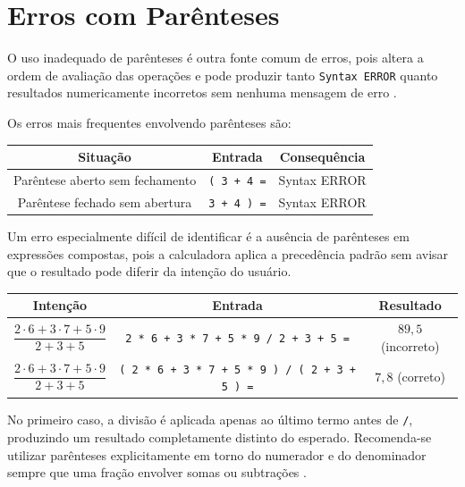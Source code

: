 \section{Erros com Parênteses}

O uso inadequado de parênteses é outra fonte comum de erros, pois altera a ordem de avaliação das operações e pode produzir tanto \texttt{Syntax ERROR} quanto resultados numericamente incorretos sem nenhuma mensagem de erro \cite{casio2004}.

Os erros mais frequentes envolvendo parênteses são:

\begin{table}[H]
    \centering
    \begin{tabular}{|c|c|c|}
        \hline
        \textbf{Situação} & \textbf{Entrada} & \textbf{Consequência} \\ \hline
        Parêntese aberto sem fechamento & \texttt{( 3 + 4 =} & Syntax ERROR \\
        Parêntese fechado sem abertura & \texttt{3 + 4 ) =} & Syntax ERROR \\ \hline
    \end{tabular}
\end{table}

Um erro especialmente difícil de identificar é a ausência de parênteses em expressões compostas, pois a calculadora aplica a precedência padrão sem avisar que o resultado pode diferir da intenção do usuário.

\begin{table}[H]
    \centering
    \renewcommand{\arraystretch}{2.0} 
    \begin{tabular}{|c|c|c|}
        \hline
        \textbf{Intenção} & \textbf{Entrada} & \textbf{Resultado} \\ \hline
        $\dfrac{2 \cdot 6 + 3 \cdot 7 + 5 \cdot 9}{2 + 3 + 5}$ & 
        \texttt{2 * 6 + 3 * 7 + 5 * 9 / 2 + 3 + 5 =} & $89{,}5$ (incorreto) \\[10pt]
        $\dfrac{2 \cdot 6 + 3 \cdot 7 + 5 \cdot 9}{2 + 3 + 5}$ & 
        \texttt{( 2 * 6 + 3 * 7 + 5 * 9 ) / ( 2 + 3 + 5 ) =} & $7{,}8$ (correto) \\ \hline
    \end{tabular}
\end{table}

No primeiro caso, a divisão é aplicada apenas ao último termo antes de \texttt{/}, produzindo um resultado completamente distinto do esperado. Recomenda-se utilizar parênteses explicitamente em torno do numerador e do denominador sempre que uma fração envolver somas ou subtrações \cite{casio2004}.

